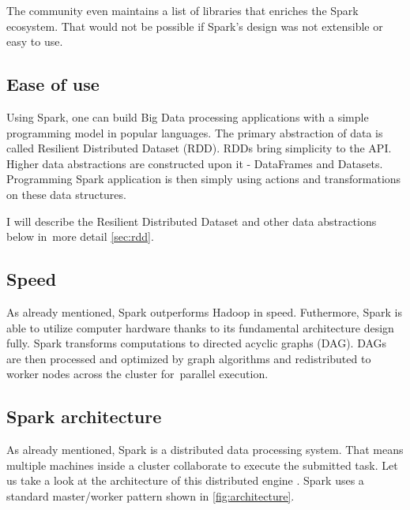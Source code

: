 The community even maintains a list of libraries that enriches the Spark ecosystem. That would not be possible if Spark's design was not extensible or easy to use.

\subsection*{Ease of use}

Using Spark, one can build Big Data processing applications with a simple programming model in popular languages. The primary abstraction of data is called Resilient Distributed Dataset (RDD). RDDs bring simplicity to the API. Higher data abstractions are constructed upon it - DataFrames and Datasets. Programming Spark application is then simply using actions and transformations on these data structures.

I will describe the Resilient Distributed Dataset and other data abstractions below in~more detail \ref{sec:rdd}.

\subsection*{Speed}

As already mentioned, Spark outperforms Hadoop in speed. Futhermore, Spark is able to utilize computer hardware thanks to its fundamental architecture design fully. Spark transforms computations to directed acyclic graphs (DAG). DAGs are then processed and optimized by graph algorithms and redistributed to worker nodes across the cluster for~parallel execution.

\pagebreak

\subsection{Spark architecture}

As already mentioned, Spark is a distributed data processing system. That means multiple machines inside a cluster collaborate to execute the submitted task. Let us take a look at the architecture of this distributed engine \cite{Sparkdip1} \cite{githubbook}. Spark uses a standard master/worker pattern shown in \ref{fig:architecture}. 

